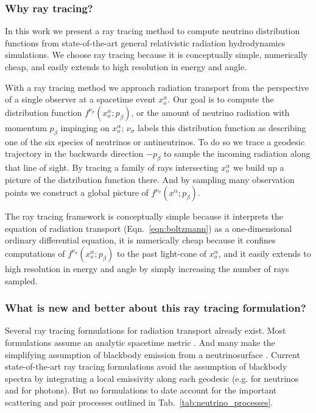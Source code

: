\documentclass[aps,prd,twocolumn,superscriptaddress]{revtex4-1}
\begin{document}
\subsubsection*{Why ray tracing?}
In this work we present a ray tracing method to compute neutrino distribution
functions from state-of-the-art general relativistic radiation
hydrodynamics simulations.
We choose ray tracing because it is conceptually simple, numerically cheap,
and easily extends to high resolution in energy and angle.

With a ray tracing method we approach radiation transport from the perspective
of a single observer at a spacetime event $x_o^\alpha$.
Our goal is to compute the distribution function
$f^{\nu_\sigma}(x_o^\alpha;p_\beta)$, or the amount of neutrino radiation
with momentum $p_\beta$ impinging on $x_o^\alpha$;
$\nu_\sigma$ labels this distribution function as describing one of the
six species of neutrinos or antineutrinos.
To do so we trace a geodesic trajectory in the backwards direction
$-p_\beta$ to sample the incoming radiation along that line of sight.
By tracing a family of rays intersecting $x_o^\alpha$ we build up a
picture of the distribution function there.
And by sampling many observation points we construct a global picture
of $f^{\nu_\sigma}(x^\alpha;p_\beta)$.

The ray tracing framework
is conceptually simple because it interprets the equation of radiation
transport (Eqn.~\ref{eqn:boltzmann})
as a one-dimensional ordinary differential equation,
it is numerically cheap because it confines computations of
$f^{\nu_\sigma}(x_o^\alpha;p_\beta)$ to the past light-cone of $x_o^\alpha$,
and it easily extends to high resolution in energy and angle by simply
increasing the number of rays sampled.

\subsubsection*{What is new and better about this ray tracing formulation?}
Several ray tracing formulations for radiation transport already exist.
Most formulations assume an analytic spacetime metric
\citep{birk2007-nunubar, hari2010-gr_nunubar_collapsar, kova2011-gr_ray_tracing}.
And many make the simplifying assumption of blackbody emission from a
neutrinosurface \citep{birk2007-nunubar, kova2011-gr_ray_tracing}.
Current state-of-the-art ray tracing formulations avoid the assumption of
blackbody spectra by integrating a local emissivity along each geodesic
(e.g. \cite{hari2010-gr_nunubar_collapsar} for neutrinos and
\cite{youn2012-gr_radiative_transfer} for photons).
But no formulations to date account for the important scattering and pair
processes outlined in Tab.~\ref{tab:neutrino_processes}.
\end{document}
